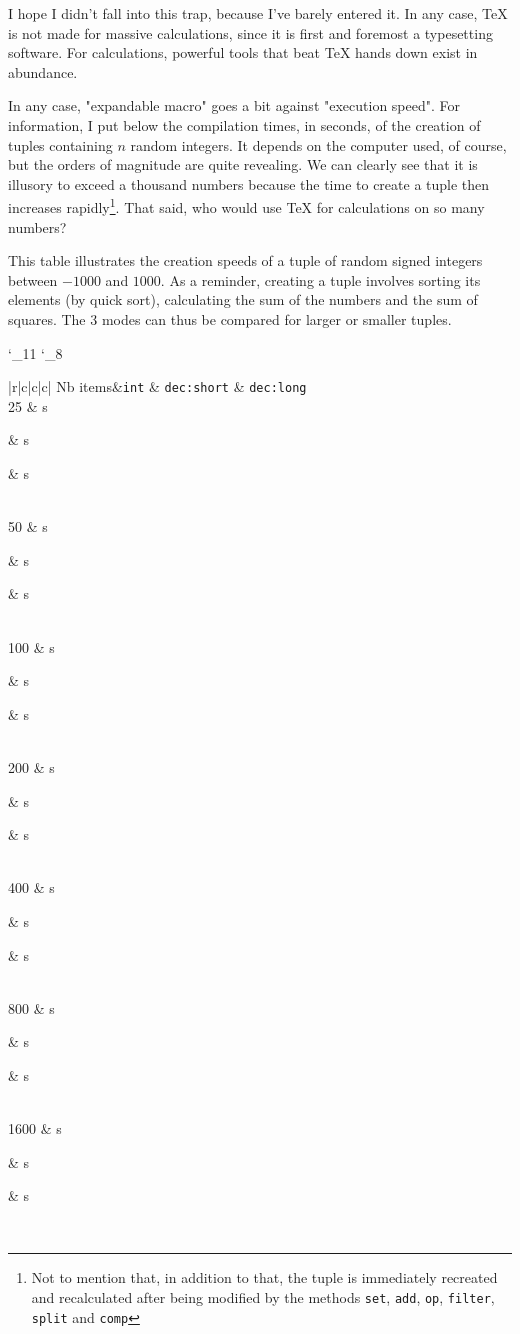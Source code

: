 \documentclass[english,a4paper]{article}
\def\tpl{\textsf\tplname}
\begin{document}
I hope I didn't fall into this trap, because I've barely entered it. In any case, \TeX{} is not made for massive calculations, since it is first and foremost a typesetting software. For calculations, powerful tools that beat \TeX{} hands down exist in abundance.

In any case, "expandable macro" goes a bit against "execution speed". For information, I put below the compilation times, in seconds, of the creation of tuples containing $n$ random integers. It depends on the computer used, of course, but the orders of magnitude are quite revealing. We can clearly see that it is illusory to exceed a thousand numbers because the time to create a tuple then increases rapidly\footnote{Not to mention that, in addition to that,  the tuple is immediately recreated and recalculated after being modified by the methods \texttt{set}, \texttt{add}, \texttt{op}, \texttt{filter}, \texttt{split} and \texttt{comp}}. That said, who would use \TeX{} for calculations on so many numbers?

This table illustrates the creation speeds of a tuple of random signed integers between $-1000$ and $1000$. As a reminder, creating a tuple involves sorting its elements (by quick sort), calculating the sum of the numbers and the sum of squares. The 3 modes can thus be compared for larger or smaller tuples.\label{benchmark}

\begin{center}
	\protected{}
	\protected{}
	\catcode`\_11
	\def\doten#1{#1#1#1#1#1#1#1#1#1#1}
	\def\falsenewtuple#1{}
	\def\printtime{\fpeval{round((\the\pdfelapsedtime-\tare)/655360,3)} s}
	\def\dotest#1{%
		\tplsetmode{#1}%
		\pdfresettimer%
		\doten{\edef\test{\expandafter\tpl_newtuple_b\expandafter{\mytuple}}\let\mytest\empty}%
		\printtime
	}
	\def\testnewtuple#1{%
		\xdef\mytuple{\gentuple{\genrule randint(-1000,1000) ; \until \i==#1 }}%
		\pdfresettimer
		\doten{\edef\mytest{\expandafter\falsenewtuple\expandafter{\mytuple}}\let\mytest\empty}%
		\xdef\tare{\the\pdfelapsedtime}%
		#1%
		&%
		\dotest{int}
		&%
		\dotest{dec:short}
		&%
		\dotest{dec:long}
	}
	\def\gentab{%
		\begin{center}
		\begin{tabular}{|r|c|c|c|}\hline
			Nb items&\texttt{int} & \texttt{dec:short} & \texttt{dec:long}\\\hline
			\testnewtuple{25}  \\\hline
			\testnewtuple{50}  \\\hline
			\testnewtuple{100} \\\hline
			\testnewtuple{200} \\\hline
			\testnewtuple{400} \\\hline
			\testnewtuple{800} \\\hline
			\testnewtuple{1600}\\\hline
		\end{tabular}
		\end{center}
	}
	\catcode`\_8
	\gentab
\end{center}
\end{document}
